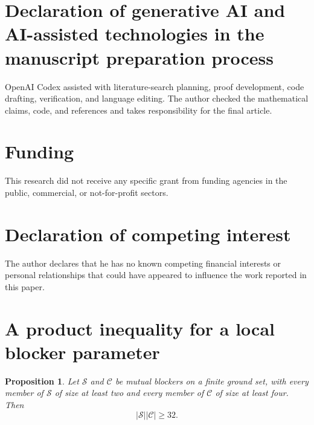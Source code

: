 \documentclass[a4paper,fleqn,longmktitle]{cas-sc}
\newtheorem{proposition}[theorem]{Proposition}
\theoremstyle{definition}
\theoremstyle{remark}
\begin{document}
\section*{Declaration of generative AI and AI-assisted technologies in the
manuscript preparation process}

OpenAI Codex assisted with literature-search planning, proof development,
code drafting, verification, and language editing.  The author checked the
mathematical claims, code, and references and takes responsibility for the
final article.

\section*{Funding}

This research did not receive any specific grant from funding agencies in the
public, commercial, or not-for-profit sectors.

\section*{Declaration of competing interest}

The author declares that he has no known competing financial interests or
personal relationships that could have appeared to influence the work
reported in this paper.

\printcredits

\appendix

\section{A product inequality for a local blocker parameter}
\label{app:m24}

\begin{proposition}
\label{prop:m24-product}
Let $\mathcal S$ and $\mathcal C$ be mutual blockers on a finite ground set,
with every member of $\mathcal S$ of size at least two and every member of
$\mathcal C$ of size at least four.  Then
\[
  |\mathcal S||\mathcal C|\geq32.
\]
\end{proposition}
\end{document}
